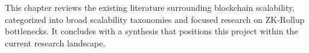 This chapter reviews the existing literature surrounding blockchain scalability, categorized into broad scalability taxonomies and focused research on ZK-Rollup bottlenecks. It concludes with a synthesis that positions this project within the current research landscape.